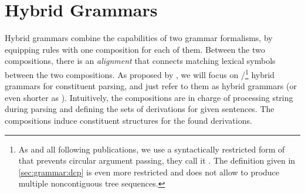 \documentclass[../../document.tex]{subfiles}
\begin{document}
    \section{Hybrid Grammars}\label{sec:grammar:hybrid}
    Hybrid grammars \citep{Ned14,Geb17,Geb20} combine the capabilities of two grammar formalisms, by equipping rules with one composition for each of them.
    Between the two compositions, there is an \emph{alignment} that connects matching lexical symbols between the two compositions.
    As proposed by \citet{Ned14}, we will focus on /\footnote{
        As \cite{Ned14} and all following publications, we use a syntactically restricted form of  that prevents circular argument passing, they call it .
        The definition given in \cref{sec:grammar:dcp} is even more restricted and does not allow to produce multiple noncontiguous tree sequences.
    } hybrid grammars for constituent parsing, and just refer to them as hybrid grammars (or even shorter as ).
    Intuitively, the  compositions are in charge of processing string during parsing and defining the sets of derivations for given sentences.
    The  compositions induce constituent structures for the found derivations.
\end{document}
